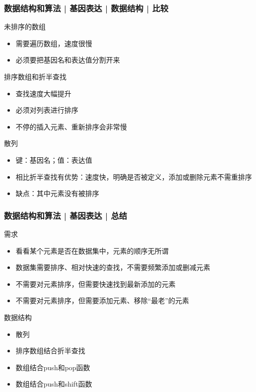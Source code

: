 \begin{frame}
  \frametitle{数据结构和算法 | 基因表达 | 数据结构 | 比较}
  \begin{block}{未排序的数组}
    \begin{itemize}
      \item 需要遍历数组，速度很慢
      \item 必须要把基因名和表达值分割开来
    \end{itemize}
  \end{block}
  \pause
  \begin{block}{排序数组和折半查找}
    \begin{itemize}
      \item 查找速度大幅提升
      \item 必须对列表进行排序
      \item 不停的插入元素、重新排序会非常慢
    \end{itemize}
  \end{block}
  \pause
  \begin{block}{散列}
    \begin{itemize}
      \item 键：基因名；值：表达值
      \item 相比折半查找有优势：速度快，明确是否被定义，添加或删除元素不需重排序
      \item 缺点：其中元素没有被排序
    \end{itemize}
  \end{block}
\end{frame}

\begin{frame}
  \frametitle{数据结构和算法 | 基因表达 | \alert{总结}}
  \begin{block}{需求}
  \begin{itemize}
    \item<1-> 看看某个元素是否在数据集中，元素的顺序无所谓
    \item<2-> 数据集需要排序、相对快速的查找，不需要频繁添加或删减元素
    \item<3-> 不需要对元素排序，但需要快速找到最新添加的元素
    \item<4-> 不需要对元素排序，但需要添加元素、移除“最老”的元素
  \end{itemize}
  \end{block}
  \begin{block}{数据结构}
    \begin{itemize}
      \item<1-> 散列
      \item<2-> 排序数组结合折半查找
      \item<3-> 数组结合push和pop函数
      \item<4-> 数组结合push和shift函数
    \end{itemize}
  \end{block}
\end{frame}

